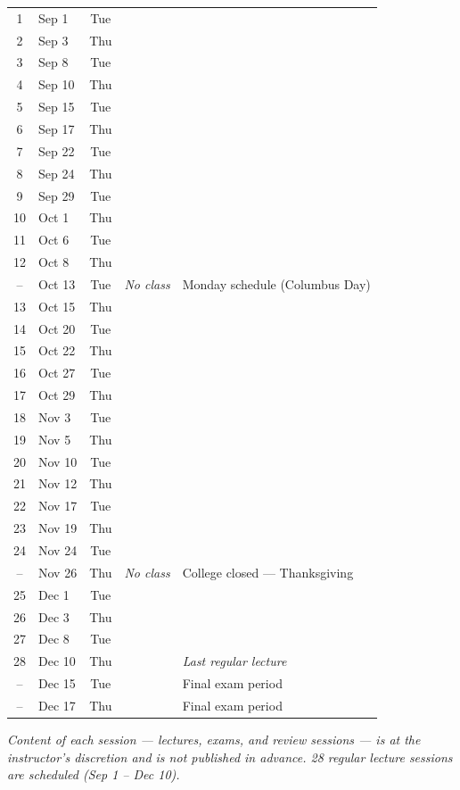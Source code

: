\documentclass[11pt]{article}
\newcommand{\offrow}{\rowcolor{RedOrange!18}}
\newcommand{\examrow}{\rowcolor{RoyalBlue!15}}
\begin{document}
\begin{center}
\begin{longtable}{@{} c l c p{6.1cm} p{3.2cm} @{}}
1  & Sep 1  & Tue & & \\
2  & Sep 3  & Thu & & \\
3  & Sep 8  & Tue & & \\
4  & Sep 10 & Thu & & \\
5  & Sep 15 & Tue & & \\
6  & Sep 17 & Thu & & \\
7  & Sep 22 & Tue & & \\
8  & Sep 24 & Thu & & \\
9  & Sep 29 & Tue & & \\
10 & Oct 1  & Thu & & \\
11 & Oct 6  & Tue & & \\
12 & Oct 8  & Thu & & \\
\offrow
-- & Oct 13 & Tue & \emph{No class} & Monday schedule (Columbus Day) \\
13 & Oct 15 & Thu & & \\
14 & Oct 20 & Tue & & \\
15 & Oct 22 & Thu & & \\
16 & Oct 27 & Tue & & \\
17 & Oct 29 & Thu & & \\
18 & Nov 3  & Tue & & \\
19 & Nov 5  & Thu & & \\
20 & Nov 10 & Tue & & \\
21 & Nov 12 & Thu & & \\
22 & Nov 17 & Tue & & \\
23 & Nov 19 & Thu & & \\
24 & Nov 24 & Tue & & \\
\offrow
-- & Nov 26 & Thu & \emph{No class} & College closed --- Thanksgiving \\
25 & Dec 1  & Tue & & \\
26 & Dec 3  & Thu & & \\
27 & Dec 8  & Tue & & \\
28 & Dec 10 & Thu & & \emph{Last regular lecture} \\
\examrow
-- & Dec 15 & Tue & & Final exam period \\
\examrow
-- & Dec 17 & Thu & & Final exam period \\
\end{longtable}
\end{center}

\vspace{4pt}
\noindent\footnotesize\textit{Content of each session --- lectures, exams, and
review sessions --- is at the instructor's discretion and is not published in
advance. 28 regular lecture sessions are scheduled (Sep 1 -- Dec 10).}
\end{document}
